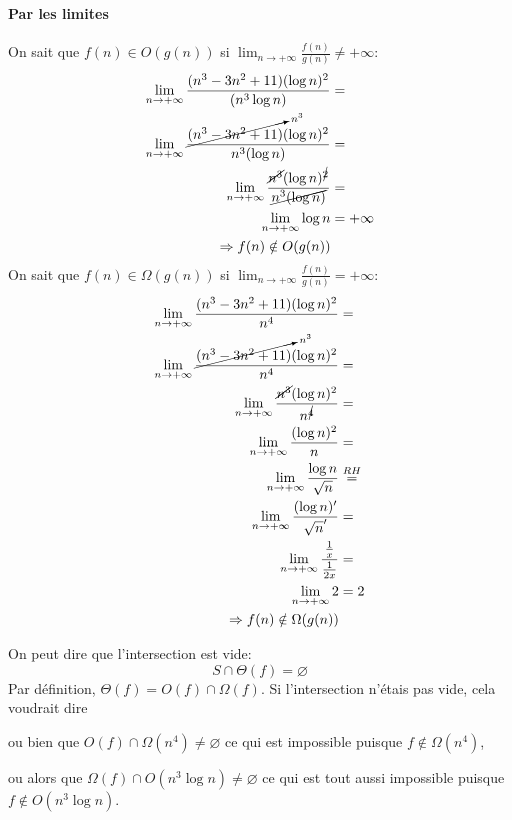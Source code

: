 \documentclass{article}
\begin{document}
\paragraph{Par les limites}
On sait que $f(n) \in O(g(n))$ si $\lim_{n\rightarrow+\infty}\frac{f(n)}{g(n)}\neq +\infty$:
$$
\begin{aligned}
  \lim_{n\rightarrow+\infty}\frac{(n^3-3n^2+11)(\log n)^2}{(n^3 \log n)} &=\\
  \lim_{n\rightarrow+\infty}\frac{\cancelto{n^3}{(n^3-3n^2+11)}(\log n)^2}{n^3 (\log n)} &=\\
  \lim_{n\rightarrow+\infty}\frac{\cancel{n^3}(\log n)^{\cancel{2}}}{\cancel{n^3 (\log n)}} &=\\
  \lim_{n\rightarrow+\infty}\log n &= + \infty\\
  \Rightarrow f(n) \notin O(g(n))
\end{aligned}
$$
On sait que $f(n) \in \Omega(g(n))$ si $\lim_{n\rightarrow+\infty}\frac{f(n)}{g(n)} = +\infty$:
$$
\begin{aligned}
  \lim_{n\rightarrow+\infty}\frac{(n^3-3n^2+11)(\log n)^2}{n^4} &=\\
  \lim_{n\rightarrow+\infty}\frac{\cancelto{n^3}{(n^3-3n^2+11)}(\log n)^2}{n^4} &=\\
  \lim_{n\rightarrow+\infty}\frac{\cancel{n^3}(\log n)^2}{n^{\cancel{4}}} &=\\
  \lim_{n\rightarrow+\infty}\frac{(\log n)^2}{n} &=\\
  \lim_{n\rightarrow+\infty}\frac{\log n}{\sqrt{n}} &\stackrel{RH}{=}\\
  \lim_{n\rightarrow+\infty}\frac{(\log n)'}{\sqrt{n}'} &=\\
  \lim_{n\rightarrow+\infty}\frac{\frac{1}{x}}{\frac{1}{2x}} &=\\
  \lim_{n\rightarrow+\infty}2 &= 2\\
  \Rightarrow f(n) \notin \Omega(g(n))
\end{aligned}
$$

On peut dire que l'intersection est vide:
\begin{equation}
  S \cap \Theta(f) = \varnothing
\end{equation}
Par définition, $\Theta(f) = O(f) \cap \Omega(f)$. Si l'intersection n'étais pas vide, cela voudrait dire

ou bien que $O(f) \cap \Omega(n^4) \neq \varnothing$ ce qui est impossible puisque $f \notin \Omega(n^4)$,

ou alors que $\Omega(f) \cap O(n^3\log n) \neq \varnothing$ ce qui est tout aussi impossible puisque $f \notin O(n^3 \log n)$.
\end{document}
